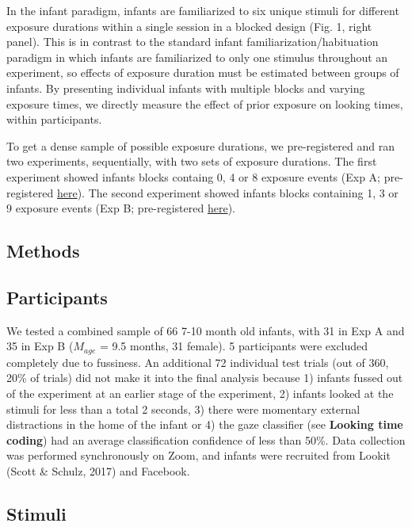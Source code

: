 \documentclass[10pt, letterpaper]{article}
\begin{document}
In the infant paradigm, infants are familiarized to six unique stimuli
for different exposure durations within a single session in a blocked
design (Fig. 1, right panel). This is in contrast to the standard infant
familiarization/habituation paradigm in which infants are familiarized
to only one stimulus throughout an experiment, so effects of exposure
duration must be estimated between groups of infants. By presenting
individual infants with multiple blocks and varying exposure times, we
directly measure the effect of prior exposure on looking times, within
participants.

To get a dense sample of possible exposure durations, we pre-registered
and ran two experiments, sequentially, with two sets of exposure
durations. The first experiment showed infants blocks containg 0, 4 or 8
exposure events (Exp A; pre-registered
\href{https://osf.io/gux4f/?view_only=b4d6d0118dfa41a79fb431d389f4fecc}{here}).
The second experiment showed infants blocks containing 1, 3 or 9
exposure events (Exp B; pre-registered
\href{https://osf.io/w6pgu/?view_only=39ee108159884761a0c5bc68d11918df}{here}).

\hypertarget{methods-1}{%
\subsection{Methods}\label{methods-1}}

\hypertarget{participants-1}{%
\subsection{Participants}\label{participants-1}}

We tested a combined sample of 66 7-10 month old infants, with 31 in Exp
A and 35 in Exp B (\(M_{age}\) = 9.5 months, 31 female). 5 participants
were excluded completely due to fussiness. An additional 72 individual
test trials (out of 360, 20\% of trials) did not make it into the final
analysis because 1) infants fussed out of the experiment at an earlier
stage of the experiment, 2) infants looked at the stimuli for less than
a total 2 seconds, 3) there were momentary external distractions in the
home of the infant or 4) the gaze classifier (see \textbf{Looking time
coding}) had an average classification confidence of less than 50\%.
Data collection was performed synchronously on Zoom, and infants were
recruited from Lookit (Scott \& Schulz, 2017) and Facebook.

\hypertarget{stimuli-1}{%
\subsection{Stimuli}\label{stimuli-1}}
\end{document}
